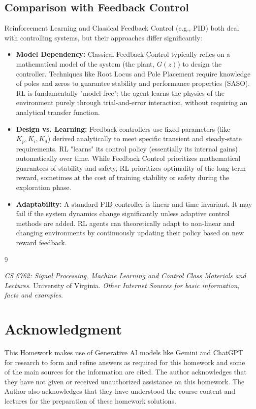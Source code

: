 \documentclass[a4paper,12pt]{article}
\begin{document}
\subsection*{Comparison with Feedback Control}
Reinforcement Learning and Classical Feedback Control (e.g., PID) both deal with controlling systems, but their approaches differ significantly:
\begin{itemize}
    \item \textbf{Model Dependency:} Classical Feedback Control typically relies on a mathematical model of the system (the plant, $G(z)$) to design the controller. Techniques like Root Locus and Pole Placement require knowledge of poles and zeros to guarantee stability and performance properties (SASO). RL is fundamentally "model-free"; the agent learns the physics of the environment purely through trial-and-error interaction, without requiring an analytical transfer function.
    \item \textbf{Design vs. Learning:} Feedback controllers use fixed parameters (like $K_p, K_i, K_d$) derived analytically to meet specific transient and steady-state requirements. RL "learns" its control policy (essentially its internal gains) automatically over time. While Feedback Control prioritizes mathematical guarantees of stability and safety, RL prioritizes optimality of the long-term reward, sometimes at the cost of training stability or safety during the exploration phase.
    \item \textbf{Adaptability:} A standard PID controller is linear and time-invariant. It may fail if the system dynamics change significantly unless adaptive control methods are added. RL agents can theoretically adapt to non-linear and changing environments by continuously updating their policy based on new reward feedback.
\end{itemize}

\begin{thebibliography}{9}

     \textit{CS 6762: Signal Processing, Machine Learning and Control Class Materials and Lectures}. University of Virginia.
     \textit{Other Internet Sources for basic information, facts and examples}.
    
\end{thebibliography}

\section*{Acknowledgment}
This Homework makes use of  Generative AI models like Gemini and ChatGPT for research to form and refine answers as required for this homework and some of the main sources for the information are cited. The author acknowledges that they have not given or received unauthorized assistance on this homework. The Author also acknowledges that they have understood the course content and lectures for the preparation of these homework solutions.
\end{document}

